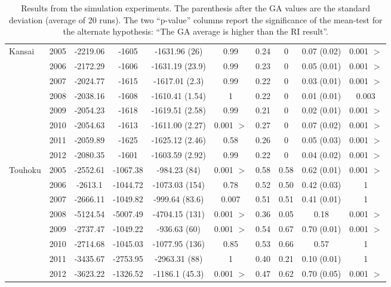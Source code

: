 \documentclass{sig-alternate}
\begin{document}
\begin{table}[t]
\begin{center}
\begin{tabular}{|ll||c|c|c|c||c|c|c|c|}
    \hline
    Kansai & 2005 &-2219.06 &-1605 &-1631.96 (26) & 0.99 & 0.24 & 0 & 0.07 (0.02) & 0.001 $>$\\
    & 2006 & -2172.29&-1606 &-1631.19 (23.9) & 0.99 & 0.23 & 0 & 0.05 (0.01) & 0.001 $>$\\
    & 2007 &-2024.77 &-1615 &-1617.01 (2.3) & 0.99 & 0.22 & 0 & 0.03 (0.01) & 0.001 $>$\\
    & 2008 &-2038.16 &-1608 &-1610.41 (1.54) & 1 & 0.22 & 0 & 0.01 (0.01) & 0.003\\
    & 2009 &-2054.23 &-1618 &-1619.51 (2.58) & 0.99 & 0.21 & 0 & 0.02 (0.01) & 0.001 $>$\\
    & 2010 & -2054.63&-1613 &-1611.00 (2.27) & 0.001 $>$ & 0.27 & 0 & 0.07 (0.02) & 0.001 $>$\\
    & 2011 &-2059.89 &-1625 &-1625.12 (2.46) & 0.58 & 0.26 & 0 & 0.05 (0.03) & 0.001 $>$\\
    & 2012 &-2080.35 &-1601 &-1603.59 (2.92) & 0.99 & 0.22 & 0 & 0.04 (0.02) & 0.001 $>$\\
    \hline
    Touhoku & 2005 &-2552.61 &-1067.38 &-984.23 (84) & 0.001 $>$ & 0.58 & 0.58 & 0.62 (0.01) & 0.001 $>$\\
    & 2006 &-2613.1 &-1044.72 &-1073.03 (154) & 0.78 & 0.52 & 0.50 & 0.42 (0.03) & 1\\
    & 2007 & -2666.11&-1049.82 &-999.64 (83.6) & 0.007 & 0.51 & 0.51 & 0.41 (0.01) & 1\\
    & 2008 & -5124.54&-5007.49 &-4704.15 (131) & 0.001 $>$ & 0.36 & 0.05 & 0.18 & 0.001 $>$\\
    & 2009 & -2737.47&-1049.22 &-936.63 (60) & 0.001 $>$ & 0.54 & 0.67 & 0.70 (0.01) & 0.001 $>$\\
    & 2010 & -2714.68&-1045.03 &-1077.95 (136) & 0.85 & 0.53 & 0.66 & 0.57 & 1\\
    & 2011 & -3435.67&-2753.95 &-2963.31 (88) & 1 & 0.40 & 0.21 & 0.10 (0.01) & 1\\
    & 2012 &-3623.22 &-1326.52 &-1186.1 (45.3) & 0.001 $>$ & 0.47 & 0.62 & 0.70 (0.05) & 0.001 $>$\\
    \hline
  \end{tabular}
  \end{center}
  \caption{Results from the simulation experiments. The parenthesis
    after the GA values are the standard deviation (average of 20
    runs). The two ``p-value'' columns report the significance of the
    mean-test for the alternate hypothesis: ``The GA average is higher
    than the RI result''.}
  \label{bigtable}
\end{table}
\end{document}
